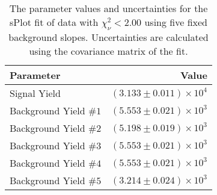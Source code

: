 
\begin{table}[ht]
    \begin{center}
        \begin{tabular}{lr}\toprule
            Parameter & Value \\\midrule
            Signal Yield & $(3.133 \pm 0.011) \times 10^{4}$ \\
            Background Yield $\#1$ & $(5.553 \pm 0.021) \times 10^{3}$ \\
            Background Yield $\#2$ & $(5.198 \pm 0.019) \times 10^{3}$ \\
            Background Yield $\#3$ & $(5.553 \pm 0.021) \times 10^{3}$ \\
            Background Yield $\#4$ & $(5.553 \pm 0.021) \times 10^{3}$ \\
            Background Yield $\#5$ & $(3.214 \pm 0.024) \times 10^{3}$ \\\bottomrule
        \end{tabular}
        \caption{The parameter values and uncertainties for the sPlot fit of data with $\chi^2_\nu < 2.00$ using five fixed background slopes. Uncertainties are calculated using the covariance matrix of the fit.}\label{tab:splot-fit-results-chisqdof-2.00-fixed-5}
    \end{center}
\end{table}

